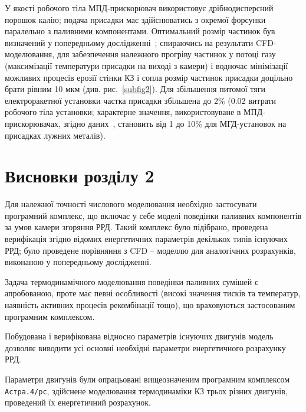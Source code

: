 У якості робочого тіла МПД-прискорювач використовує дрібнодисперсний порошок калію; подача присадки має здійснюватись з окремої форсунки паралельно з паливними компонентами. Оптимальний розмір частинок був визначений у попередньому дослідженні~\cite{Previous}; спираючись на результати CFD-моделювання, для забезпечення належного прогріву частинок у потоці газу (максимізації температури присадки на виході з камери) і водночас мінімізації можливих процесів ерозії стінки КЗ і сопла розмір частинок присадки доцільно брати рівним 10 мкм (див. рис.~\ref{subfig2}). Для збільшення питомої тяги електроракетної установки частка присадки збільшена до 2\% (0.02 витрати робочого тіла установки; характерне значення, використовуване в МПД-прискорювачах, згідно даних~\cite{Panchenko}, становить від 1 до 10\% для МГД-установок на присадках лужних металів).

\section{Висновки розділу 2}

Для належної точності числового моделювання необхідно застосувати програмний комплекс, що включає у себе моделі поведінки паливних компонентів за умов камери згоряння РРД. Такий комплекс було підібрано, проведена верифікація згідно відомих енергетичних параметрів декількох типів існуючих РРД; було проведене порівняння з CFD -- моделлю для аналогічних розрахунків, виконаною у попередньому дослідженні.

Задача термодинамічного моделювання поведінки паливних сумішей є апробованою, проте має певні особливості (високі значення тисків та температур, наявність активних процесів рекомбінації тощо), що враховуються застосованим програмним комплексом.

Побудована і верифікована відносно параметрів існуючих двигунів модель дозволяє виводити усі основні необхідні параметри енергетичного розрахунку РРД.

Параметри двигунів були опрацьовані вищеозначеним програмним комплексом \texttt{Астра.4/рс}, здійснене моделювання термодинаміки КЗ трьох різних двигунів, проведений їх енергетичний розрахунок.